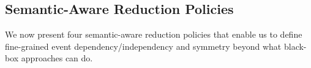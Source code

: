 \subsection{Semantic-Aware Reduction Policies}
\label{sam-pol}



We now present four semantic-aware reduction policies that enable us to
define fine-grained event dependency/independency and symmetry beyond
what black-box approaches can do.













%
%


